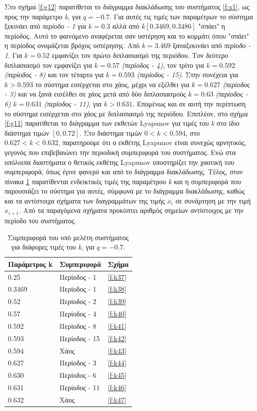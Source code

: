 Στο σχήμα \ref{f:g12} παρατίθεται το διάγραμμα διακλάδωσης του συστήματος \ref{f:x1}, ως προς την παράμετρο \emph{k}, για $q =- 0.7$. Για αυτές τις τιμές των παραμέτρων το σύστημα ξεκινάει από \emph{περίοδο - 1} για $k=0.3$ αλλά από $k[0.3469,0.3486]$ "σπάει" η περίοδος. Αυτό το φαινόμενο αναφέρεται σαν υστέρηση και το κομμάτι όπου "σπάει" η περίοδος ονομάζεται βρόχος υστέρησης. Από $k=3.469$ ξαναξεκινάει από \emph{περίοδο - 1}. Για  $k = 0.52$ εμφανίζει τον πρώτο διπλασιασμό της περιόδου. Τον δεύτερο διπλασιασμό τον εμφανίζει για $k=0.57$ \emph{(περίοδος -  4)}, τον τρίτο για $k=0.592$ \emph{(περίοδος -  8)} και τον τέταρτο για $k=0.593$ \emph{(περίοδος - 15)}. Στην συνέχεια για $k>0.593$ το σύστημα εισέρχεται στο χάος, μέχρι να εξέλθει  για $k=0.627$ \emph{(περίοδος -   3)} και να ξανά εισέλθει σε χάος μετά από δύο διπλασιασμούς $k=0.63$ \emph{(περίοδος -   6)} $k=0.631$ \emph{(περίοδος -   11)}, για $k>0.631$.
Επομένως και σε αυτή την περίπτωση το σύστημα εισέρχεται στο χάος με διπλασιασμό της περιόδου. 
Επιπλέον, στο σχήμα \ref{f:g11} παρατίθεται το διάγραμμα των εκθετών Lyapunov για τιμές του \emph{k} στο ίδιο διάστημα τιμών $[0, 0.72]$. Στο διάστημα τιμών $0<k<0.594$, στο $0.627<k<0.632$, παρατηρούμε ότι ο εκθέτης Lyapunov είναι συνεχώς αρνητικός, γεγονός που επιβεβαιώνει την περιοδική συμπεριφορά του συστήματος. Ενώ στα υπόλοιπα διαστήματα ο θετικός εκθέτης Lyapunov υποστηρίζει την χαοτική του συμπεριφορά, όπως έγινε φανερό και από το διάγραμμα διακλάδωσης.
Τέλος, στον πίνακα \ref{tab:abc3} παρατίθενται ενδεικτικές τιμές της παραμέτρου \emph{k} και η συμπεριφορά που παρουσιάζει το σύστημα για αυτές, σύμφωνα με το διάγραμμα διακλάδωσης, καθώς και τα αντίστοιχα σχήματα των διαγραμμάτων της τιμής \(x_i\) σε συνάρτηση με την τιμή \(x_{i+1}\). Από τα παραγόμενα σχήματα προκύπτει αριθμός σημείων αντίστοιχος με την περίοδο του συστήματος.

\begin{table}[h!]
	\centering
	\caption{ Συμπεριφορά του υπό μελέτη συστήματος για διάφορες τιμές του \emph{k}, για $q=-0.7$.}
	\label{tab:abc3}
	\begin{tabular}{l | l | l}
		Παράμετρος k & Συμπεριφορά & Σχήμα\\
		\hline
		0.25 &  Περίοδος -  1 & \ref{f:k37}\\
		0.3469&  Περίοδος -  1 & \ref{f:k38}\\
		0.52& Περίοδος -  2 & \ref{f:k39}\\
		0.57& Περίοδος -  4 & \ref{f:k40}\\
		0.592 &  Περίοδος -  8 & \ref{f:k41}\\
		0.593& Περίοδος -  15 & \ref{f:k42}\\
		0.594 & Χάος & \ref{f:k43}\\
		0.627 & Περίοδος -  3 & \ref{f:k44}\\
		0.630 & Περίοδος -  6 & \ref{f:k45}\\
		0.631 & Περίοδος -  11 & \ref{f:k46}\\
		0.632 & Χάος & \ref{f:k47}\\
	\end{tabular}
	
\end{table}

